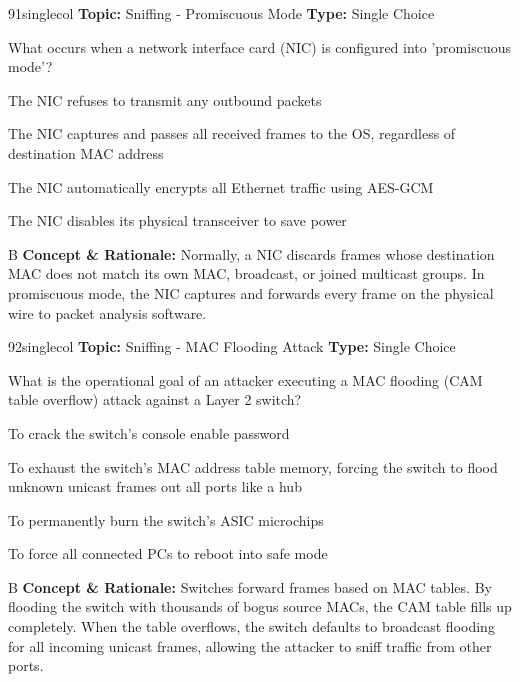 \begin{qcard}{91}{singlecol}
\textcolor{darkslate!75}{\small\textbf{Topic:} Sniffing - Promiscuous Mode \hfill \textbf{Type:} Single Choice}\vspace{0.4em}\par
What occurs when a network interface card (NIC) is configured into 'promiscuous mode'?
\begin{qoptions}
\item The NIC refuses to transmit any outbound packets
\item The NIC captures and passes all received frames to the OS, regardless of destination MAC address
\item The NIC automatically encrypts all Ethernet traffic using AES-GCM
\item The NIC disables its physical transceiver to save power
\end{qoptions}
\end{qcard}
\nopagebreak
\begin{explainbox}{B}
\textbf{Concept \& Rationale:} Normally, a NIC discards frames whose destination MAC does not match its own MAC, broadcast, or joined multicast groups. In promiscuous mode, the NIC captures and forwards every frame on the physical wire to packet analysis software.
\end{explainbox}

\begin{qcard}{92}{singlecol}
\textcolor{darkslate!75}{\small\textbf{Topic:} Sniffing - MAC Flooding Attack \hfill \textbf{Type:} Single Choice}\vspace{0.4em}\par
What is the operational goal of an attacker executing a MAC flooding (CAM table overflow) attack against a Layer 2 switch?
\begin{qoptions}
\item To crack the switch's console enable password
\item To exhaust the switch's MAC address table memory, forcing the switch to flood unknown unicast frames out all ports like a hub
\item To permanently burn the switch's ASIC microchips
\item To force all connected PCs to reboot into safe mode
\end{qoptions}
\end{qcard}
\nopagebreak
\begin{explainbox}{B}
\textbf{Concept \& Rationale:} Switches forward frames based on MAC tables. By flooding the switch with thousands of bogus source MACs, the CAM table fills up completely. When the table overflows, the switch defaults to broadcast flooding for all incoming unicast frames, allowing the attacker to sniff traffic from other ports.
\end{explainbox}

